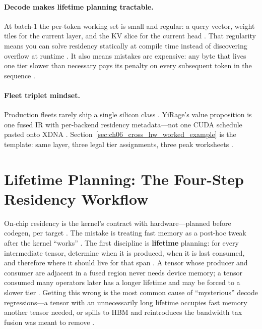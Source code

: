 \paragraph{Decode makes lifetime planning tractable.}
At batch-1 the per-token working set is small and regular: a query vector, weight tiles for the current layer, and the KV slice for the current head \citep{kwon2023vllm}.
That regularity means you can solve residency statically at compile time instead of discovering overflow at runtime \citep{rotem2018glow,yirage2026}.
It also means mistakes are expensive: any byte that lives one tier slower than necessary pays its penalty on every subsequent token in the sequence \citep{patel2025llminference,dao2022flashattention}.

\paragraph{Fleet triplet mindset.}
Production fleets rarely ship a single silicon class \citep{patel2025llminference,yirage2026}.
YiRage's value proposition is one fused IR with per-backend residency metadata---not one CUDA schedule pasted onto XDNA \citep{amd2024xdna,chen2020compilerbasedhardw}.
Section~\ref{sec:ch06_cross_hw_worked_example} is the template: same layer, three legal tier assignments, three peak worksheets \citep{yirage2026,memoryfloor2026}.


\section{Lifetime Planning: The Four-Step Residency Workflow}
\label{sec:ch06_lifetime_planning}

On-chip residency is the kernel's contract with hardware---planned before codegen, per target \citep{dlbook,yirage2026}.
The mistake is treating fast memory as a post-hoc tweak after the kernel ``works'' \citep{taxbreak2026,memoryfloor2026}.
The first discipline is \textbf{lifetime} planning: for every intermediate tensor, determine when it is produced, when it is last consumed, and therefore where it should live for that span \citep{rotem2018glow,wu2024mirage}.
A tensor whose producer and consumer are adjacent in a fused region never needs device memory; a tensor consumed many operators later has a longer lifetime and may be forced to a slower tier \citep{dao2022flashattention,dlbook}.
Getting this wrong is the most common cause of ``mysterious'' decode regressions---a tensor with an unnecessarily long lifetime occupies fast memory another tensor needed, or spills to HBM and reintroduces the bandwidth tax fusion was meant to remove \citep{taxbreak2026,memoryfloor2026}.

